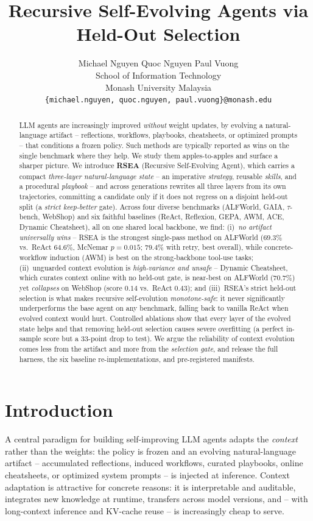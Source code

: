 \documentclass{article}
\title{Recursive Self-Evolving Agents via Held-Out Selection}
\author{
  Michael Nguyen \quad Quoc Nguyen \quad Paul Vuong \\
  School of Information Technology\\
  Monash University Malaysia\\
  \texttt{\{michael.nguyen, quoc.nguyen, paul.vuong\}@monash.edu}
}
\begin{document}
\maketitle

\begin{abstract}
LLM agents are increasingly improved \emph{without} weight updates, by evolving a
natural-language artifact -- reflections, workflows, playbooks, cheatsheets, or
optimized prompts -- that conditions a frozen policy. Such methods are typically
reported as wins on the single benchmark where they help. We study them
apples-to-apples and surface a sharper picture. We introduce \textbf{RSEA}
(Recursive Self-Evolving Agent), which carries a compact \emph{three-layer
natural-language state} -- an imperative \emph{strategy}, reusable \emph{skills},
and a procedural \emph{playbook} -- and across generations rewrites all three layers
from its own trajectories, committing a candidate only if it does not regress on a
disjoint held-out split (a \emph{strict keep-better} gate). Across four diverse
benchmarks (ALFWorld, GAIA, $\tau$-bench, WebShop) and six faithful baselines
(ReAct, Reflexion, GEPA, AWM, ACE, Dynamic Cheatsheet), all on one shared local
backbone, we find: (i)~\emph{no artifact universally wins} -- RSEA is the strongest
single-pass method on ALFWorld ($69.3\%$ vs.\ ReAct $64.6\%$, McNemar $p{=}0.015$;
$79.4\%$ with retry, best overall), while concrete-workflow induction (AWM) is best
on the strong-backbone tool-use tasks; (ii)~unguarded context evolution is
\emph{high-variance and unsafe} -- Dynamic Cheatsheet, which curates context online
with no held-out gate, is near-best on ALFWorld ($70.7\%$) yet \emph{collapses} on
WebShop (score $0.14$ vs.\ ReAct $0.43$); and (iii)~RSEA's strict held-out selection
is what makes recursive self-evolution \emph{monotone-safe}: it never significantly
underperforms the base agent on any benchmark, falling back to vanilla ReAct when
evolved context would hurt. Controlled ablations show that every layer of
the evolved state helps and that removing held-out selection causes severe
overfitting (a perfect in-sample score but a $33$-point drop to test). We argue the
reliability of context evolution comes less from the
artifact and more from the \emph{selection gate}, and release the full harness, the
six baseline re-implementations, and pre-registered manifests.
\end{abstract}

\section{Introduction}
A central paradigm for building self-improving LLM agents adapts the \emph{context}
rather than the weights: the policy is frozen and an evolving natural-language
artifact -- accumulated reflections, induced workflows, curated playbooks, online
cheatsheets, or optimized system prompts -- is injected at inference. Context
adaptation is attractive for concrete reasons: it is interpretable and auditable,
integrates new knowledge at runtime, transfers across model versions, and -- with
long-context inference and KV-cache reuse -- is increasingly cheap to serve.
\end{document}
